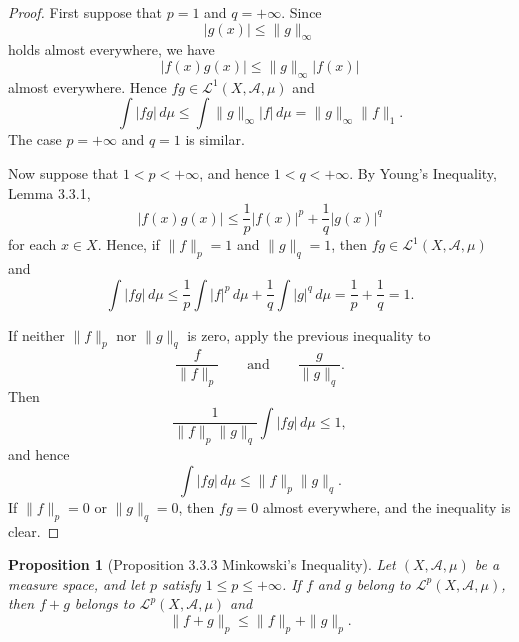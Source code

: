 \documentclass[12pt]{article}
\newtheorem{proposition}{Proposition}
\begin{document}
\begin{proof}
First suppose that $p=1$ and $q=+\infty$. Since
\[
|g(x)|\le \|g\|_\infty
\]
holds almost everywhere, we have
\[
|f(x)g(x)|\le \|g\|_\infty |f(x)|
\]
almost everywhere. Hence $fg\in \mathcal{L}^1(X,\mathcal{A},\mu)$ and
\[
\int |fg|\,d\mu
\le
\int \|g\|_\infty |f|\,d\mu
=
\|g\|_\infty\|f\|_1.
\]
The case $p=+\infty$ and $q=1$ is similar.

Now suppose that $1<p<+\infty$, and hence $1<q<+\infty$. By Young's
Inequality, Lemma 3.3.1,
\[
|f(x)g(x)|
\le
\frac1p |f(x)|^p+\frac1q |g(x)|^q
\]
for each $x\in X$. Hence, if $\|f\|_p=1$ and $\|g\|_q=1$, then
$fg\in \mathcal{L}^1(X,\mathcal{A},\mu)$ and
\[
\int |fg|\,d\mu
\le
\frac1p\int |f|^p\,d\mu
+
\frac1q\int |g|^q\,d\mu
=
\frac1p+\frac1q
=
1.
\]

If neither $\|f\|_p$ nor $\|g\|_q$ is zero, apply the previous inequality to
\[
\frac{f}{\|f\|_p}
\qquad\text{and}\qquad
\frac{g}{\|g\|_q}.
\]
Then
\[
\frac{1}{\|f\|_p\|g\|_q}
\int |fg|\,d\mu
\le 1,
\]
and hence
\[
\int |fg|\,d\mu
\le
\|f\|_p\|g\|_q.
\]
If $\|f\|_p=0$ or $\|g\|_q=0$, then $fg=0$ almost everywhere, and the inequality
is clear.
\end{proof}

\begin{proposition}[Proposition 3.3.3 Minkowski's Inequality]
Let $(X,\mathcal{A},\mu)$ be a measure space, and let $p$ satisfy
$1\le p\le +\infty$. If $f$ and $g$ belong to
$\mathcal{L}^p(X,\mathcal{A},\mu)$, then $f+g$ belongs to
$\mathcal{L}^p(X,\mathcal{A},\mu)$ and
\[
\|f+g\|_p\le \|f\|_p+\|g\|_p.
\]
\end{proposition}
\end{document}
